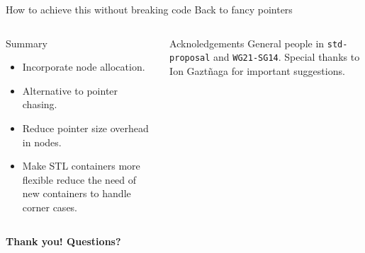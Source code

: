 \documentclass[10pt,aspectratio=169]{beamer}
\begin{document}
\begin{frame}[fragile]
{How to achieve this without breaking code}
{Back to fancy pointers}

\begin{columns}
\begin{column}{0.47\textwidth}
\begin{block}{Summary}
\begin{itemize}
\item Incorporate node allocation.
\item Alternative to pointer chasing.
\item Reduce pointer size overhead in nodes.
\item Make STL containers more flexible reduce
the need of new containers to handle corner cases.
\end{itemize}
\end{block}
\end{column}
\begin{column}{0.47\textwidth}
\begin{block}{Acknoledgements}
General people in \texttt{std-proposal} and \texttt{WG21-SG14}.
Special thanks to Ion Gazt\~ naga for important suggestions.
\end{block}
\end{column}
\end{columns}

\end{frame}

\begin{frame}{}
    \vspace{1cm}
    \begin{center}
        {\Large \bf Thank you! Questions?} 
    \end{center}
\end{frame}
\end{document}
